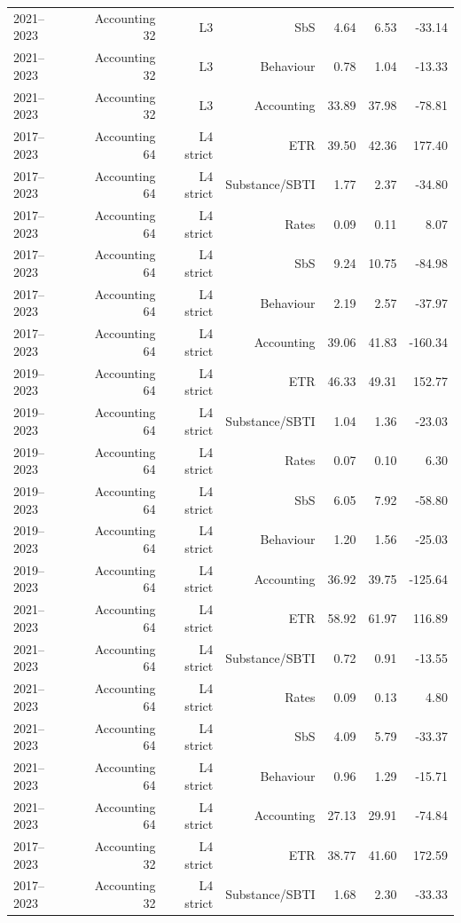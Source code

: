 {\begin{longtable}{@{}lrrrrrr@{}}
2021–2023 & Accounting 32 & L3 & SbS &  4.64 &  6.53 &  -33.14 \\
2021–2023 & Accounting 32 & L3 & Behaviour &  0.78 &  1.04 &  -13.33 \\
2021–2023 & Accounting 32 & L3 & Accounting & 33.89 & 37.98 &  -78.81 \\
2017–2023 & Accounting 64 & L4 strict & ETR & 39.50 & 42.36 &  177.40 \\
2017–2023 & Accounting 64 & L4 strict & Substance/SBTI &  1.77 &  2.37 &  -34.80 \\
2017–2023 & Accounting 64 & L4 strict & Rates &  0.09 &  0.11 &    8.07 \\
2017–2023 & Accounting 64 & L4 strict & SbS &  9.24 & 10.75 &  -84.98 \\
2017–2023 & Accounting 64 & L4 strict & Behaviour &  2.19 &  2.57 &  -37.97 \\
2017–2023 & Accounting 64 & L4 strict & Accounting & 39.06 & 41.83 & -160.34 \\
2019–2023 & Accounting 64 & L4 strict & ETR & 46.33 & 49.31 &  152.77 \\
2019–2023 & Accounting 64 & L4 strict & Substance/SBTI &  1.04 &  1.36 &  -23.03 \\
2019–2023 & Accounting 64 & L4 strict & Rates &  0.07 &  0.10 &    6.30 \\
2019–2023 & Accounting 64 & L4 strict & SbS &  6.05 &  7.92 &  -58.80 \\
2019–2023 & Accounting 64 & L4 strict & Behaviour &  1.20 &  1.56 &  -25.03 \\
2019–2023 & Accounting 64 & L4 strict & Accounting & 36.92 & 39.75 & -125.64 \\
2021–2023 & Accounting 64 & L4 strict & ETR & 58.92 & 61.97 &  116.89 \\
2021–2023 & Accounting 64 & L4 strict & Substance/SBTI &  0.72 &  0.91 &  -13.55 \\
2021–2023 & Accounting 64 & L4 strict & Rates &  0.09 &  0.13 &    4.80 \\
2021–2023 & Accounting 64 & L4 strict & SbS &  4.09 &  5.79 &  -33.37 \\
2021–2023 & Accounting 64 & L4 strict & Behaviour &  0.96 &  1.29 &  -15.71 \\
2021–2023 & Accounting 64 & L4 strict & Accounting & 27.13 & 29.91 &  -74.84 \\
2017–2023 & Accounting 32 & L4 strict & ETR & 38.77 & 41.60 &  172.59 \\
2017–2023 & Accounting 32 & L4 strict & Substance/SBTI &  1.68 &  2.30 &  -33.33 \\

\end{longtable}}
